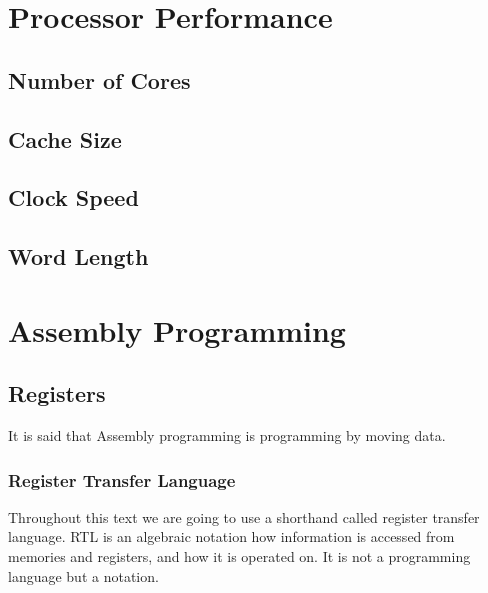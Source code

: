 	\section{Processor Performance}
		\subsection{Number of Cores}
		
		\subsection{Cache Size}
		
		\subsection{Clock Speed}
		
		\subsection{Word Length}

	\section{Assembly Programming}
		
		\subsection{Registers}
			It is said that Assembly programming is programming by moving data. 
%		
		
		
			\subsubsection{Register Transfer Language}
				 Throughout this text we are going to use a shorthand called register transfer language. RTL is an algebraic notation how information is accessed from memories and registers, and how it is operated on. It is not a programming language but a notation.
				

